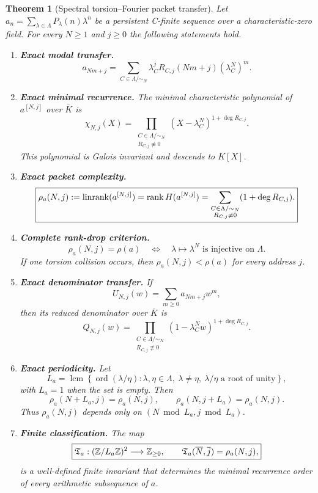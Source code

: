 \documentclass[11pt]{article}
\newtheorem{theorem}{Theorem}[section]\newtheorem{proposition}[theorem]{Proposition}\newtheorem{lemma}[theorem]{Lemma}\newtheorem{corollary}[theorem]{Corollary}
\theoremstyle{definition}\newtheorem{definition}[theorem]{Definition}\newtheorem{example}[theorem]{Example}\newtheorem{construction}[theorem]{Construction}\newtheorem{algorithm}[theorem]{Algorithm}\newtheorem{conjecture}[theorem]{Conjecture}\newtheorem{problem}[theorem]{Problem}
\theoremstyle{remark}\newtheorem{remark}[theorem]{Remark}\newtheorem{boundary}[theorem]{Boundary}\newtheorem{certificate}[theorem]{Computational Certificate}\newtheorem{classical}[theorem]{Classical Input}\newtheorem{principle}[theorem]{Structural Principle}
\begin{document}
\begin{theorem}[Spectral torsion--Fourier packet transfer]
\label{thm:spectral-torsion-fourier}
Let $a_n=\sum_{\lambda\in\Lambda}P_\lambda(n)\lambda^n$ be a persistent C-finite sequence over a characteristic-zero field.  For every $N\geq1$ and $j\geq0$ the following statements hold.

\begin{enumerate}[label=\textup{(\arabic*)}]
\item \textbf{Exact modal transfer.}
\[
 \boxed{
 a_{Nm+j}
 =
 \sum_{C\in\Lambda/{\sim_N}}
 \lambda_C^j R_{C,j}(Nm+j)(\lambda_C^N)^m.
 }
\]

\item \textbf{Exact minimal recurrence.}  The minimal characteristic polynomial of $a^{[N,j]}$ over $\overline K$ is
\[
 \boxed{
 \chi_{N,j}(X)
 =
 \prod_{\substack{C\in\Lambda/{\sim_N}\\R_{C,j}\not\equiv0}}
 (X-\lambda_C^N)^{1+\deg R_{C,j}}.
 }
\]
This polynomial is Galois invariant and descends to $K[X]$.

\item \textbf{Exact packet complexity.}
\[
 \boxed{
 \rho_a(N,j)
 :=\operatorname{linrank}(a^{[N,j]})
 =\operatorname{rank} H(a^{[N,j]})
 =
 \sum_{\substack{C\in\Lambda/{\sim_N}\\R_{C,j}\not\equiv0}}
 (1+\deg R_{C,j}).
 }
\]

\item \textbf{Complete rank-drop criterion.}
\[
 \boxed{
 \rho_a(N,j)=\rho(a)
 \quad\Longleftrightarrow\quad
 \lambda\mapsto\lambda^N
 \text{ is injective on }\Lambda.
 }
\]
If one torsion collision occurs, then $\rho_a(N,j)<\rho(a)$ for every address $j$.

\item \textbf{Exact denominator transfer.}  If
\[
 U_{N,j}(w)=\sum_{m\geq0}a_{Nm+j}w^m,
\]
then its reduced denominator over $\overline K$ is
\[
 \boxed{
 Q_{N,j}(w)
 =
 \prod_{\substack{C\in\Lambda/{\sim_N}\\R_{C,j}\not\equiv0}}
 (1-\lambda_C^Nw)^{1+\deg R_{C,j}}.
 }
\]

\item \textbf{Exact periodicity.}  Let
\[
 \boxed{
 L_a=
 \operatorname{lcm}\left\{
 \operatorname{ord}(\lambda/\eta):
 \lambda,\eta\in\Lambda,\ \lambda\neq\eta,
 \ \lambda/\eta\text{ a root of unity}
 \right\},
 }
\]
with $L_a=1$ when the set is empty.  Then
\[
 \boxed{
 \rho_a(N+L_a,j)=\rho_a(N,j),
 \qquad
 \rho_a(N,j+L_a)=\rho_a(N,j).
 }
\]
Thus $\rho_a(N,j)$ depends only on $(N\bmod L_a,j\bmod L_a)$.

\item \textbf{Finite classification.}  The map
\[
 \boxed{
 \mathfrak T_a:(\mathbb Z/L_a\mathbb Z)^2\longrightarrow\mathbb Z_{\geq0},
 \qquad
 \mathfrak T_a(\overline N,\overline j)=\rho_a(N,j),
 }
\]
is a well-defined finite invariant that determines the minimal recurrence order of every arithmetic subsequence of $a$.
\end{enumerate}
\end{theorem}
\end{document}
